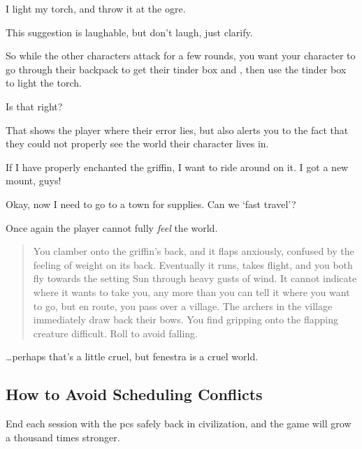 \begin{multicols}{2}
\begin{boxtext}
  I light my \gls{torch}, and throw it at the \gls{ogre}.
\end{boxtext}

This suggestion is laughable, but don't laugh, just clarify.

\begin{speechtext}
  So while the other characters attack for a few rounds, you want your character to go through their backpack to get their tinder box and , then use the tinder box to light the \gls{torch}.

  Is that right?
\end{speechtext}

That shows the player where their error lies, but also alerts you to the fact that they could not properly see the world their character lives in.

\begin{boxtext}
  If I have properly enchanted the \gls{griffin}, I want to ride around on it.
  I got a new mount, guys!

  Okay, now I need to go to a town for supplies.
  Can we `fast travel'?
\end{boxtext}

Once again the player cannot fully \emph{feel} the world.

\null
\begin{quote}
  You clamber onto the \gls{griffin}'s back, and it flaps anxiously, confused by the feeling of weight on its back.
  Eventually it runs, takes flight, and you both fly towards the setting Sun through heavy gusts of wind.
  It cannot indicate where it wants to take you, any more than you can tell it where you want to go, but en route, you pass over a \gls{village}.
  The archers in the \gls{village} immediately draw back their bows.
  You find gripping onto the flapping creature difficult.
  Roll  to avoid falling.
\end{quote}

\ldots perhaps that's a little cruel, but \gls{fenestra} is a cruel world.

\subsection{How to Avoid Scheduling Conflicts}
\label{realtimeScheduling}

End each session with the \glspl{pc} safely back in civilization, and the game will grow a thousand times stronger.


\end{multicols}
